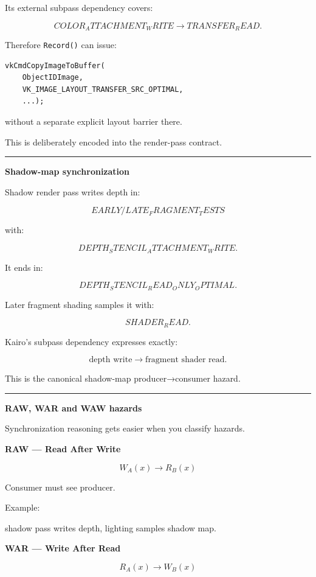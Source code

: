 Its external subpass dependency covers:

\[
COLOR_ATTACHMENT_WRITE
\rightarrow
TRANSFER_READ.
\]

Therefore \texttt{Record()} can issue:

\begin{verbatim}
vkCmdCopyImageToBuffer(
    ObjectIDImage,
    VK_IMAGE_LAYOUT_TRANSFER_SRC_OPTIMAL,
    ...);
\end{verbatim}

without a separate explicit layout barrier there.

This is deliberately encoded into the render-pass contract.

\begin{center}\rule{0.5\linewidth}{0.5pt}\end{center}

\textbf{Shadow-map synchronization}

Shadow render pass writes depth in:

\[
EARLY/LATE_FRAGMENT_TESTS
\]

with:

\[
DEPTH_STENCIL_ATTACHMENT_WRITE.
\]

It ends in:

\[
DEPTH_STENCIL_READ_ONLY_OPTIMAL.
\]

Later fragment shading samples it with:

\[
SHADER_READ.
\]

Kairo's subpass dependency expresses exactly:

\[
\text{depth write}
\rightarrow
\text{fragment shader read}.
\]

This is the canonical shadow-map producer→consumer hazard.

\begin{center}\rule{0.5\linewidth}{0.5pt}\end{center}

\textbf{RAW, WAR and WAW hazards}

Synchronization reasoning gets easier when you classify hazards.

\textbf{RAW --- Read After Write}

\[
W_A(x)
\rightarrow
R_B(x)
\]

Consumer must see producer.

Example:

shadow pass writes depth, lighting samples shadow map.

\textbf{WAR --- Write After Read}

\[
R_A(x)
\rightarrow
W_B(x)
\]


